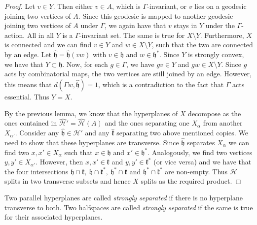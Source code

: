 \begin{proof}
  Let \(v \in Y\). Then either \(v \in A\), which is \(\Gamma\)-invariant, or \(v\) lies on a geodesic joining two vertices of \(A\). Since this geodesic is mapped to another geodesic joining two vertices of \(A\) under \(\Gamma\), we again have that \(v\) stays in \(Y\) under the \(\Gamma\)-action. All in all \(Y\) is a \(\Gamma\)-invariant set. The same is true for \(X \setminus Y\). Furthermore, \(X\) is connected and we can find \(v \in Y\) and \(w \in X \setminus Y\), such that the two are connected by an edge. Let \(\mathfrak{\hat h} = \mathfrak{\hat h}(vw)\) with \(v \in \mathfrak{h}\) and \(w \in \mathfrak{h}^\ast\). Since \(Y\) is strongly convex, we have that \(Y \subset \mathfrak{h}\). Now, for each \(g \in \Gamma\), we have \(gv \in Y\) and \(gw \in X \setminus Y\). Since \(g\) acts by combinatorial maps, the two vertices are still joined by an edge. However, this means that \(d(\Gamma w, \mathfrak{\hat h}) = 1\), which is a contradiction to the fact that \(\Gamma\) acts essential. Thus \(Y = X\).

  By the previous lemma, we know that the hyperplanes of \(X\) decompose as the ones contained in \(\mathcal{\hat H'} = \mathcal{\hat H}(A)\) and the ones separating one \(X_\alpha\) from another \(X_{\alpha'}\). Consider any \(\mathfrak{\hat h} \in \mathcal{\hat H'}\) and any \(\mathfrak{\hat k}\) separating two above mentioned copies. We need to show that these hyperplanes are transverse. Since \(\mathfrak{\hat h}\) separates \(X_\alpha\) we can find two \(x, x' \in X_\alpha\) such that \(x \in \mathfrak{h}\) and \(x' \in \mathfrak{h}^\ast\). Analogously, we find two vertices \(y,y' \in X_{\alpha'}\). However, then \(x,x' \in \mathfrak{k}\) and \(y,y' \in \mathfrak{k}^\ast\) (or vice versa) and we have that the four intersections \(\mathfrak{h} \cap \mathfrak{k},\ \mathfrak{h} \cap \mathfrak{k}^\ast,\ \mathfrak{h}^\ast \cap \mathfrak{k}\) and \(\mathfrak{h}^\ast \cap \mathfrak{k}^\ast\) are non-empty. Thus \(\mathcal{H}\) splits in two transverse subsets and hence \(X\) splits as the required product.
\end{proof}

\begin{defin}
  Two parallel hyperplanes are called \emph{strongly separated} if there is no hyperplane transverse to both. Two halfspaces are called \emph{strongly separated} if the same is true for their associated hyperplanes.
\end{defin}

